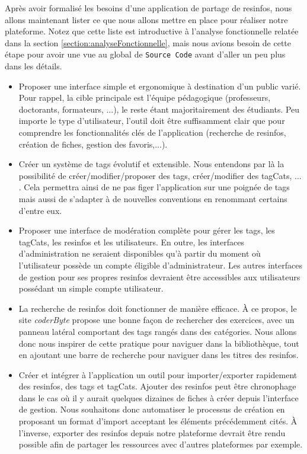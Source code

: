 Après avoir formalisé les besoins d'une application de partage de \glspl{resinfo}, nous allons maintenant lister ce que nous allons mettre en place pour réaliser notre plateforme. Notez que cette liste est introductive à l'analyse fonctionnelle relatée dans la section \ref{section:analyseFonctionnelle}, mais nous avions besoin de cette étape pour avoir une vue au global de \texttt{Source Code} avant d'aller un peu plus dans les détails.

\begin{itemize}
    \item Proposer une interface simple et ergonomique à destination d'un public varié. Pour rappel, la cible principale est l'équipe pédagogique (professeurs, doctorants, formateurs, ...), le reste étant majoritairement des étudiants. Peu importe le type d'utilisateur, l'outil doit être suffisamment clair que pour comprendre les fonctionnalités clés de l'application (recherche de \glspl{resinfo}, création de \glspl{fiche}, gestion des favoris,...).
    \item Créer un système de \glspl{tag} évolutif et extensible. Nous entendons par là la possibilité de créer/modifier/proposer des \glspl{tag}, créer/modifier des \glspl{tagCat}, ... . Cela permettra ainsi de ne pas figer l'application sur une poignée de \glspl{tag} mais aussi de s'adapter à de nouvelles conventions en renommant certains d'entre eux.
    \item Proposer une interface de modération complète pour gérer les \glspl{tag}, les \glspl{tagCat}, les \glspl{resinfo} et les utilisateurs. En outre, les interfaces d'administration ne seraient disponibles qu'à partir du moment où l'utilisateur possède un compte éligible d'administrateur. Les autres interfaces de gestion pour ses propres \glspl{resinfo} devraient être accessibles aux utilisateurs possédant un simple compte utilisateur.
    \item La recherche de \glspl{resinfo} doit fonctionner de manière efficace. À ce propos, le site \textit{coderByte} propose une bonne façon de rechercher des exercices, avec un panneau latéral comportant des \glspl{tag} rangés dans des catégories. Nous allons donc nous inspirer de cette pratique pour naviguer dans la bibliothèque, tout en ajoutant une barre de recherche pour naviguer dans les titres des \glspl{resinfo}.
    \item Créer et intégrer à l'application un outil pour importer/exporter rapidement des \glspl{resinfo}, des \glspl{tag} et \glspl{tagCat}. Ajouter des \glspl{resinfo} peut être chronophage dans le cas où il y aurait quelques dizaines de \glspl{fiche} à créer depuis l'interface de gestion. Nous souhaitons donc automatiser le processus de création en proposant un format d'import acceptant les éléments précédemment cités. À l'inverse, exporter des \glspl{resinfo} depuis notre plateforme devrait être rendu possible afin de partager les ressources avec d'autres plateformes par exemple.

\end{itemize}
